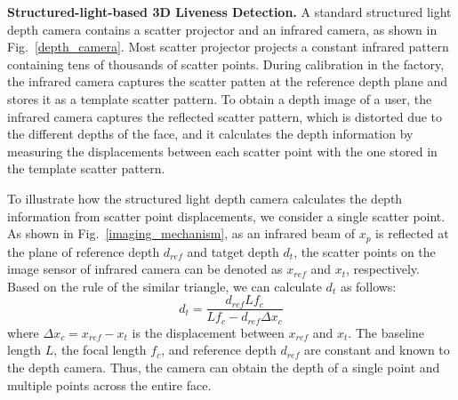 \textbf{Structured-light-based 3D Liveness Detection.} A standard structured light depth camera contains a scatter projector and an infrared camera, as shown in Fig.~\ref{depth_camera}. Most scatter projector projects a constant infrared pattern containing tens of thousands of scatter points. During calibration in the factory, the infrared camera captures the scatter patten at the reference depth plane and stores it as a template scatter pattern. To obtain a depth image of a user,  the infrared camera captures the reflected scatter pattern, which is distorted due to the different depths of the face, and it calculates the depth information by measuring the displacements between each scatter point with the one stored in the template scatter pattern.


%

To illustrate how the structured light depth camera calculates the depth information from scatter point displacements, we consider a single scatter point.
As shown in Fig.~\ref{imaging_mechanism}, as an infrared beam of $x_p$ is reflected at the plane of reference depth $d_{ref}$ and tatget depth $d_t$, the scatter points on the image sensor of infrared camera can be denoted as $x_{ref}$ and $x_{t}$, respectively. 
Based on the rule of the similar triangle, we can calculate $d_t$ as follows:
\begin{equation}
	d_t= \frac{d_{ref}Lf_c}{Lf_c - d_{ref}\Delta x_c}
	\label{d_cal}
\end{equation}
where $\Delta x_c=x_{ref}-x_{t}$ is the displacement between $x_{ref}$ and $x_{t}$. The baseline length $L$, the focal length $f_c$, and reference depth $d_{ref}$ are constant and known to the depth camera. Thus,  the camera can obtain the depth of a single point and multiple points across the entire face.

